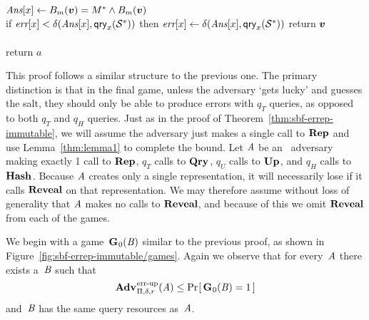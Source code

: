 \begin{figure*}
{{    \tab $\textit{Ans}[x] \gets {B}_m(\boldsymbol{v}) = M^* \wedge {B}_m(\boldsymbol{v})$\\
    \tab if $\textit{err}[x] < \delta(\textit{Ans}[x],\mathsf{qry}_x(\mathcal{S}^*))$ then
    \tab\tab $\textit{err}[x] \gets \delta(\textit{Ans}[x],\mathsf{qry}_x(\mathcal{S}^*))$
    }
    return $\boldsymbol{v}$
}
{
  \vspace{-7pt}
  \
      \hfill {} \\[2pt]
    \\[2pt]
    return $a$
}
\caption{Games 0, 1, and 2 for proof of Theorem~\ref{thm:sbf-errep-priv}.}
\label{fig:sbf-errep-immutable/games}
\end{figure*}

This proof follows a similar structure to the previous one. The primary distinction is that in the final game, unless the adversary `gets lucky' and guesses the salt, they should only be able to produce errors with $q_T$ queries, as opposed to both $q_T$ and $q_H$ queries.
%
Just as in the proof of Theorem~\ref{thm:sbf-errep-immutable}, we will assume the adversary just makes a single call to $\textup{\textbf{Rep}}\hspace{0.5pt}$ and use Lemma~\ref{thm:lemma1} to complete the bound. Let $\mathit{A}$ be an \erreps\ adversary making exactly 1 call to $\textup{\textbf{Rep}}\hspace{0.5pt}$, $q_T$ calls to $\textup{\textbf{Qry}}\hspace{0.5pt}$, $q_U$ calls to $\textup{\textbf{Up}}\hspace{0.5pt}$, and $q_H$ calls to $\textup{\textbf{Hash}}\hspace{0.5pt}$. Because $\mathit{A}$ creates only a single representation, it will necessarily lose if it calls $\mathbf{Reveal}$ on that representation. We may therefore assume without loss of generality that $\mathit{A}$ makes no calls to $\mathbf{Reveal}$, and because of this we omit $\mathbf{Reveal}$ from each of the games.

We begin with a game~$\textup{\textbf{G}}\hspace{0.5pt}_0(\mathit{B})$ similar to the previous proof, as shown in Figure~\ref{fig:sbf-errep-immutable/games}. Again we observe that for every~$\mathit{A}$ there exists a~$\mathit{B}$  such that
\begin{equation}
  \Adv{\errep}_{\Pi,\delta,r}(\advA) \leq \Prob{\game_0(\advB) = 1}
\end{equation}
and~$\mathit{B}$ has the same query resources as~$\mathit{A}$.

